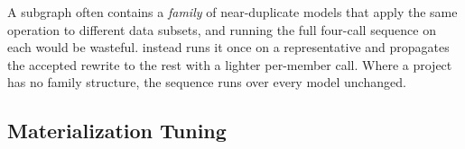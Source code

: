 


A subgraph often contains a \emph{family} of near-duplicate models that apply the same operation to different data subsets, and running the full four-call sequence on each would be wasteful. \tool{} instead runs it once on a representative and propagates the accepted rewrite to the rest with a lighter per-member call. Where a project has no family structure, the sequence runs over every model unchanged.












\subsection{Materialization Tuning}
\label{sec:materialization}




